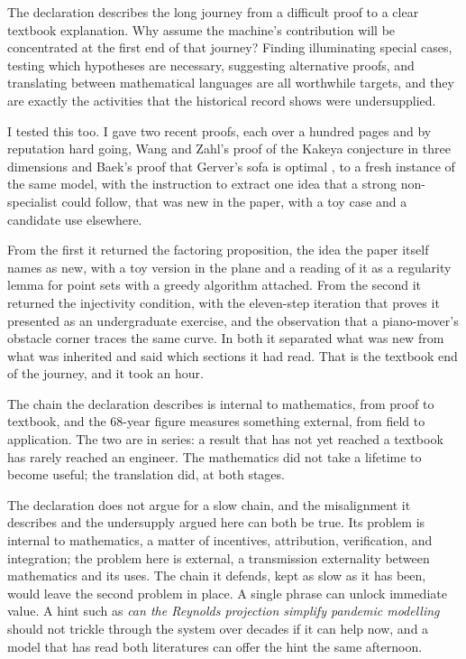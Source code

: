 \documentclass[11pt]{article}
\theoremstyle{definition}
\theoremstyle{remark}
\begin{document}
The declaration describes the long journey from a difficult proof to a clear textbook explanation. Why assume the machine's contribution will be concentrated at the first end of that journey? Finding illuminating special cases, testing which hypotheses are necessary, suggesting alternative proofs, and translating between mathematical languages are all worthwhile targets, and they are exactly the activities that the historical record shows were undersupplied.

I tested this too. I gave two recent proofs, each over a hundred pages and by reputation hard going, Wang and Zahl's proof of the Kakeya conjecture in three dimensions \citep{wangzahl2025} and Baek's proof that Gerver's sofa is optimal \citep{baek2024}, to a fresh instance of the same model, with the instruction to extract one idea that a strong non-specialist could follow, that was new in the paper, with a toy case and a candidate use elsewhere.

From the first it returned the factoring proposition, the idea the paper itself names as new, with a toy version in the plane and a reading of it as a regularity lemma for point sets with a greedy algorithm attached. From the second it returned the injectivity condition, with the eleven-step iteration that proves it presented as an undergraduate exercise, and the observation that a piano-mover's obstacle corner traces the same curve. In both it separated what was new from what was inherited and said which sections it had read. That is the textbook end of the journey, and it took an hour.

The chain the declaration describes is internal to mathematics, from proof to textbook, and the 68-year figure measures something external, from field to application. The two are in series: a result that has not yet reached a textbook has rarely reached an engineer. The mathematics did not take a lifetime to become useful; the translation did, at both stages.

The declaration does not argue for a slow chain, and the misalignment it describes and the undersupply argued here can both be true. Its problem is internal to mathematics, a matter of incentives, attribution, verification, and integration; the problem here is external, a transmission externality between mathematics and its uses. The chain it defends, kept as slow as it has been, would leave the second problem in place. A single phrase can unlock immediate value. A hint such as \emph{can the Reynolds projection simplify pandemic modelling} should not trickle through the system over decades if it can help now, and a model that has read both literatures can offer the hint the same afternoon.
\end{document}
